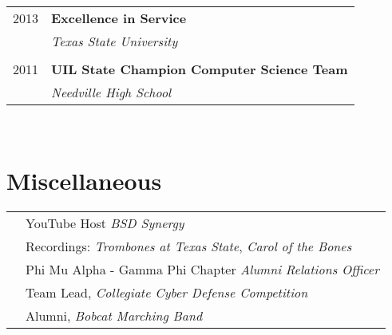 \documentclass[10pt]{article} %
\begin{document}
\begin{minipage}[t]{0.44\textwidth}
\begin{tabular}{rl}
2013     & \textbf{Excellence in Service}\\
& \textit{Texas State University}\\ \\


2011	 & \textbf{UIL State Champion Computer Science Team}\\
& \textit{Needville High School}
\end{tabular}\\[10pt]






\section{Miscellaneous} 

\begin{tabular}{rl}
& YouTube Host \textit{BSD Synergy}\\
& Recordings: \textit{Trombones at Texas State}, \textit{Carol of the Bones} \\
& Phi Mu Alpha - Gamma Phi Chapter \textit{Alumni Relations Officer}  \\
& Team Lead, \textit{Collegiate Cyber Defense Competition}\\
& Alumni, \textit{Bobcat Marching Band}\\
\end{tabular}\\[10pt]

	
\end{minipage} %
\end{document}
